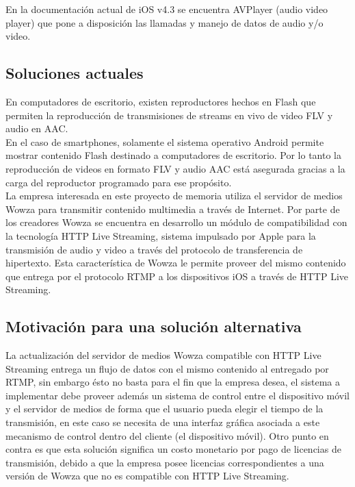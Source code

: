 En la documentación actual de iOS v4.3 se encuentra AVPlayer (audio video player) \cite{bib:avplayer-periodic} que pone a disposición las llamadas y manejo de datos de audio y/o video.


\subsection{Soluciones actuales}
En computadores de escritorio, existen reproductores hechos en Flash que permiten la reproducción de transmisiones de streams en vivo de video FLV y audio en AAC.\\

	En el caso de smartphones, solamente el sistema operativo Android permite mostrar contenido Flash destinado a computadores de escritorio. Por lo tanto la reproducción de videos en formato FLV y audio AAC está asegurada gracias a la carga del reproductor programado para ese propósito.\\

La empresa interesada en este proyecto de memoria utiliza el servidor de medios Wowza \cite{cap1:wowzamediaserver} para transmitir contenido multimedia a través de Internet. Por parte de los creadores Wowza se encuentra en desarrollo un módulo de compatibilidad con la tecnología HTTP Live Streaming, sistema impulsado por Apple para la transmisión de audio y video a través del protocolo de transferencia de hipertexto. Esta característica de Wowza le permite proveer del mismo contenido que entrega por el protocolo RTMP a los dispositivos iOS a través de HTTP Live Streaming.

\enlargethispage{2\baselineskip}
\subsection{Motivación para una solución alternativa}
La actualización del servidor de medios Wowza compatible con HTTP Live Streaming entrega un flujo de datos con el mismo contenido al entregado por RTMP, sin embargo ésto no basta para el fin que la empresa desea, el sistema a implementar debe proveer además un sistema de control entre el dispositivo móvil y el servidor de medios de forma que el usuario pueda elegir el tiempo de la transmisión, en este caso se necesita de una interfaz gráfica asociada a este mecanismo de control dentro del cliente (el dispositivo móvil). Otro punto en contra es que esta solución significa un costo monetario por pago de licencias de transmisión, debido a que la empresa posee licencias correspondientes a una versión de Wowza que no es compatible con HTTP Live Streaming. \\

